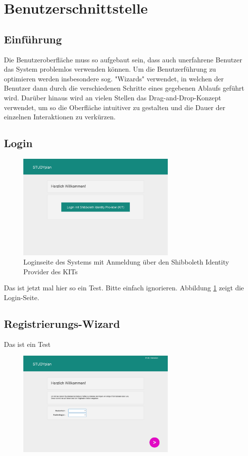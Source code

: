 \section{Benutzerschnittstelle}

\subsection{Einführung}
Die Benutzeroberfläche muss so aufgebaut sein, dass auch unerfahrene Benutzer das System problemlos verwenden können.
Um die Benutzerführung zu optimieren werden insbesondere sog. "Wizards" verwendet, in welchen der Benutzer dann durch die verschiedenen Schritte eines gegebenen Ablaufs geführt wird. Darüber hinaus wird an vielen Stellen das Drag-and-Drop-Konzept verwendet, um so die Oberfläche intuitiver zu gestalten und die Dauer der einzelnen Interaktionen zu verkürzen.

\subsection{Login}
\begin{figure}[!htb]
	\caption{Loginseite des Systems mit Anmeldung über den Shibboleth Identity Provider des KITs}
	\label{fig:gui-login-1}
	\centering
	\includegraphics[width=0.7\textwidth]{../GUI/ergebnisse/login-1.png}
\end{figure}
Das ist jetzt mal hier so ein Test. Bitte einfach ignorieren.
Abbildung \ref{fig:gui-login-1} zeigt die Login-Seite.
\subsection{Registrierungs-Wizard}
Das ist ein Test
\begin{figure}[!htb]
	\caption{}
	\label{fig:gui-registrierung-1}
	\centering
	\includegraphics[width=0.7\textwidth]{../GUI/ergebnisse/registrierung-1.png}
\end{figure}

